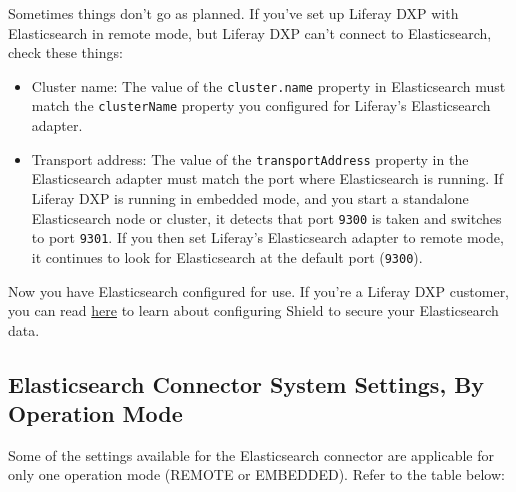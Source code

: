 Sometimes things don't go as planned. If you've set up Liferay DXP with
Elasticsearch in remote mode, but Liferay DXP can't connect to
Elasticsearch, check these things:

\begin{itemize}
\item
  Cluster name: The value of the \texttt{cluster.name} property in
  Elasticsearch must match the \texttt{clusterName} property you
  configured for Liferay's Elasticsearch adapter.
\item
  Transport address: The value of the \texttt{transportAddress} property
  in the Elasticsearch adapter must match the port where Elasticsearch
  is running. If Liferay DXP is running in embedded mode, and you start
  a standalone Elasticsearch node or cluster, it detects that port
  \texttt{9300} is taken and switches to port \texttt{9301}. If you then
  set Liferay's Elasticsearch adapter to remote mode, it continues to
  look for Elasticsearch at the default port (\texttt{9300}).
\end{itemize}

Now you have Elasticsearch configured for use. If you're a Liferay DXP
customer, you can read
\href{/docs/7-0/deploy/-/knowledge_base/d/securing-elasticsearch-with-shield}{here}
to learn about configuring Shield to secure your Elasticsearch data.

\subsection{Elasticsearch Connector System Settings, By Operation
Mode}\label{elasticsearch-connector-system-settings-by-operation-mode}

Some of the settings available for the Elasticsearch connector are
applicable for only one operation mode (REMOTE or EMBEDDED). Refer to
the table below:

